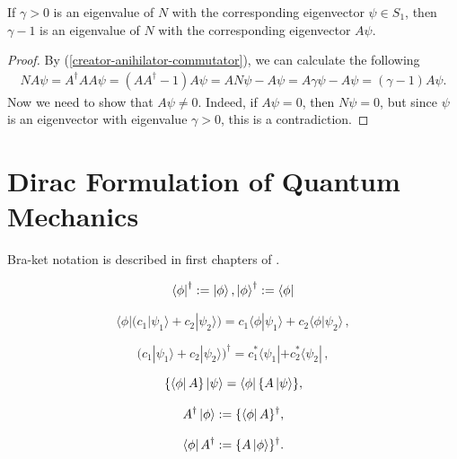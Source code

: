 \documentclass[main.tex]{subfiles}
\begin{document}
\begin{fact}
If $\gamma > 0$ is an eigenvalue of $N$ with the corresponding eigenvector $\psi\in S_1$, then $\gamma - 1$ is an eigenvalue of $N$ with the corresponding eigenvector $A\psi$.
\end{fact}
\begin{proof}
By (\ref{creator-anihilator-commutator}), we can calculate the following
\begin{multline}
N A\psi = A^\dag A A \psi = (AA^\dag - 1)A\psi = AN\psi - A\psi = A\gamma\psi - A\psi = (\gamma - 1)A\psi.
\end{multline}
Now we need to show that $A\psi \not= 0$. Indeed, if $A\psi=0$, then $N\psi = 0$, but since $\psi$ is an eigenvector with eigenvalue $\gamma > 0$, this is a contradiction.
\end{proof}
\section{Dirac Formulation of Quantum Mechanics}

Bra-ket notation is described in first chapters of \cite{dirac1981}.

\begin{equation}
\bra{\phi}^\dagger := \ket{\phi}, \ket{\phi}^\dagger := \bra{\phi}
\end{equation}

\begin{equation}
\langle\phi| \bigl( c_1|\psi_1\rangle + c_2|\psi_2\rangle \bigr) = c_1\langle\phi|\psi_1\rangle + c_2\langle\phi|\psi_2\rangle \,,
\end{equation}



\begin{equation}
\bigl(c_1|\psi_1\rangle + c_2|\psi_2\rangle\bigr)^\dagger = c_1^* \langle\psi_1| + c_2^* \langle\psi_2| \,,
\end{equation}

\begin{equation}
\{\bra{\phi}A\}\ket{\psi} = \bra{\phi}\{A\ket{\psi}\},
\end{equation}

\begin{equation}
A^\dagger \ket{\phi}:= \{\bra{\phi}A\}^\dagger,
\end{equation}

\begin{equation}
\bra{\phi} A^\dagger:= \{A\ket{\phi}\}^\dagger.
\end{equation}
\end{document}

